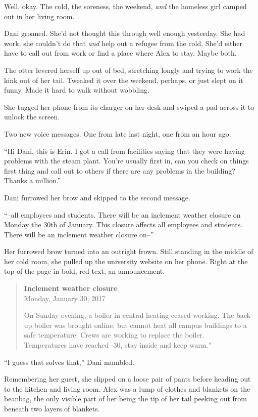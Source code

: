 Well, okay. The cold, the soreness, the weekend, \emph{and} the homeless girl camped out in her living room.

Dani groaned. She'd not thought this through well enough yesterday. She had work, she couldn't do that \emph{and} help out a refugee from the cold. She'd either have to call out from work or find a place where Alex to stay. Maybe both.

The otter levered herself up out of bed, stretching longly and trying to work the kink out of her tail. Tweaked it over the weekend, perhaps, or just slept on it funny. Made it hard to walk without wobbling.

She tugged her phone from its charger on her desk and swiped a pad across it to unlock the screen.

Two new voice messages. One from late last night, one from an hour ago.

``Hi Dani, this is Erin. I got a call from facilities saying that they were having problems with the steam plant. You're usually first in, can you check on things first thing and call out to others if there are any problems in the building? Thanks a million.''

Dani furrowed her brow and skipped to the second message.

``--all employees and students. There will be an inclement weather closure on Monday the 30th of January. This closure affects all employees and students. There will be an inclement weather closure on--''

Her furrowed brow turned into an outright frown. Still standing in the middle of her cold room, she pulled up the university website on her phone. Right at the top of the page in bold, red text, an announcement.

\begin{quote}
\textbf{Inclement weather closure}\\
Monday, January 30, 2017

On Sunday evening, a boiler in central heating ceased working. The back-up boiler was brought online, but cannot heat all campus buildings to a safe temperature. Crews are working to replace the boiler.\\
Temperatures have reached -30, stay inside and keep warm."
\end{quote}

``I guess that solves that,'' Dani mumbled.

Remembering her guest, she slipped on a loose pair of pants before heading out to the kitchen and living room. Alex was a lump of clothes and blankets on the beanbag, the only visible part of her being the tip of her tail peeking out from beneath two layers of blankets.

